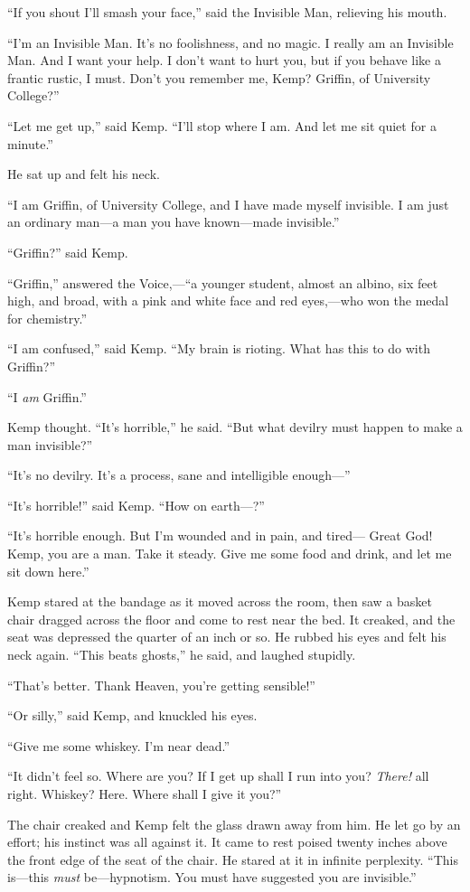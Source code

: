 “If you shout I’ll smash your face,” said the Invisible Man, relieving his mouth.

“I’m an Invisible Man. It’s no foolishness, and no magic. I really am an Invisible Man. And I want your help. I don’t want to hurt you, but if you behave like a frantic rustic, I must. Don’t you remember me, Kemp? Griffin, of University College?”

“Let me get up,” said Kemp. “I’ll stop where I am. And let me sit quiet for a minute.”

He sat up and felt his neck.

“I am Griffin, of University College, and I have made myself invisible. I am just an ordinary man—a man you have known—made invisible.”

“Griffin?” said Kemp.

“Griffin,” answered the Voice,—“a younger student, almost an albino, six feet high, and broad, with a pink and white face and red eyes,—who won the medal for chemistry.”

“I am confused,” said Kemp. “My brain is rioting. What has this to do with Griffin?”

“I \emph{am} Griffin.”

Kemp thought. “It’s horrible,” he said. “But what devilry must happen to make a man invisible?”

“It’s no devilry. It’s a process, sane and intelligible enough—”

“It’s horrible!” said Kemp. “How on earth—?”

“It’s horrible enough. But I’m wounded and in pain, and tired— Great God! Kemp, you are a man. Take it steady. Give me some food and drink, and let me sit down here.”

Kemp stared at the bandage as it moved across the room, then saw a basket chair dragged across the floor and come to rest near the bed. It creaked, and the seat was depressed the quarter of an inch or so. He rubbed his eyes and felt his neck again. “This beats ghosts,” he said, and laughed stupidly.

“That’s better. Thank Heaven, you’re getting sensible!”

“Or silly,” said Kemp, and knuckled his eyes.

“Give me some whiskey. I’m near dead.”

“It didn’t feel so. Where are you? If I get up shall I run into you? \emph{There!} all right. Whiskey? Here. Where shall I give it you?”

The chair creaked and Kemp felt the glass drawn away from him. He let go by an effort; his instinct was all against it. It came to rest poised twenty inches above the front edge of the seat of the chair. He stared at it in infinite perplexity. “This is—this \emph{must} be—hypnotism. You must have suggested you are invisible.”

